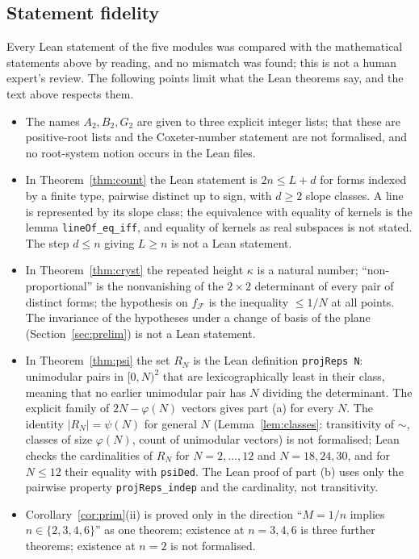 \documentclass[11pt]{amsart}
\theoremstyle{definition}
\theoremstyle{remark}
\newcommand{\lean}[1]{\texttt{#1}}
\begin{document}
\subsection*{Statement fidelity}
Every Lean statement of the five modules was compared with the mathematical statements above by reading, and no mismatch was found; this is not a human expert's review. The following points limit what the Lean theorems say, and the text above respects them.
\begin{itemize}[leftmargin=1.5em]
\item The names $A_2,B_2,G_2$ are given to three explicit integer lists; that these are positive-root lists and the Coxeter-number statement are not formalised, and no root-system notion occurs in the Lean files.
\item In Theorem~\ref{thm:count} the Lean statement is $2n\le L+d$ for forms indexed by a finite type, pairwise distinct up to sign, with $d\ge2$ slope classes. A line is represented by its slope class; the equivalence with equality of kernels is the lemma \lean{lineOf\_eq\_iff}, and equality of kernels as real subspaces is not stated. The step $d\le n$ giving $L\ge n$ is not a Lean statement.
\item In Theorem~\ref{thm:cryst} the repeated height $\kappa$ is a natural number; ``non-proportional'' is the nonvanishing of the $2\times2$ determinant of every pair of distinct forms; the hypothesis on $f_{\mathcal F}$ is the inequality $\le1/N$ at all points. The invariance of the hypotheses under a change of basis of the plane (Section~\ref{sec:prelim}) is not a Lean statement.
\item In Theorem~\ref{thm:psi} the set $R_N$ is the Lean definition \lean{projReps N}: unimodular pairs in $[0,N)^2$ that are lexicographically least in their class, meaning that no earlier unimodular pair has $N$ dividing the determinant. The explicit family of $2N-\varphi(N)$ vectors gives part (a) for every $N$. The identity $|R_N|=\psi(N)$ for general $N$ (Lemma~\ref{lem:classes}: transitivity of $\sim$, classes of size $\varphi(N)$, count of unimodular vectors) is not formalised; Lean checks the cardinalities of $R_N$ for $N=2,\dots,12$ and $N=18,24,30$, and for $N\le12$ their equality with \lean{psiDed}. The Lean proof of part (b) uses only the pairwise property \lean{projReps\_indep} and the cardinality, not transitivity.
\item Corollary~\ref{cor:prim}(ii) is proved only in the direction ``$M=1/n$ implies $n\in\{2,3,4,6\}$'' as one theorem; existence at $n=3,4,6$ is three further theorems; existence at $n=2$ is not formalised.

\end{itemize}
\end{document}
